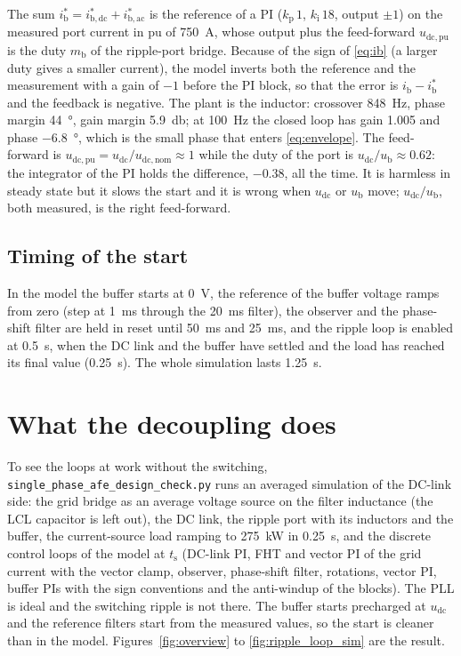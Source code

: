 \documentclass[11pt,a4paper]{scrartcl}
\newcommand{\ped}[1]{_{\mathrm{#1}}}
\newcommand{\code}[1]{\texttt{#1}}
\begin{document}
\begin{onehalfspace}
The sum $i\ped{b}^* = i\ped{b,dc}^* + i\ped{b,ac}^*$ is the reference of a PI ($k\ped{p}\,1$, $k\ped{i}\,18$, output $\pm 1$) on the measured port current in pu of \SI{750}{\ampere}, whose output plus the feed-forward $u\ped{dc,pu}$ is the duty $m\ped{b}$ of the ripple-port bridge. Because of the sign of \eqref{eq:ib} (a larger duty gives a smaller current), the model inverts both the reference and the measurement with a gain of $-1$ before the PI block, so that the error is $i\ped{b} - i\ped{b}^*$ and the feedback is negative. The plant is the inductor: crossover \SI{848}{\hertz}, phase margin \SI{44}{\degree}, gain margin \SI{5.9}{\decibel}; at \SI{100}{\hertz} the closed loop has gain 1.005 and phase \SI{-6.8}{\degree}, which is the small phase that enters \eqref{eq:envelope}. The feed-forward is $u\ped{dc,pu} = u\ped{dc}/u\ped{dc,nom} \approx 1$ while the duty of the port is $u\ped{dc}/u\ped{b} \approx 0.62$: the integrator of the PI holds the difference, $-0.38$, all the time. It is harmless in steady state but it slows the start and it is wrong when $u\ped{dc}$ or $u\ped{b}$ move; $u\ped{dc}/u\ped{b}$, both measured, is the right feed-forward.

\subsection{Timing of the start}

In the model the buffer starts at \SI{0}{\volt}, the reference of the buffer voltage ramps from zero (step at \SI{1}{\milli\second} through the \SI{20}{\milli\second} filter), the observer and the phase-shift filter are held in reset until \SI{50}{\milli\second} and \SI{25}{\milli\second}, and the ripple loop is enabled at \SI{0.5}{\second}, when the DC link and the buffer have settled and the load has reached its final value (\SI{0.25}{\second}). The whole simulation lasts \SI{1.25}{\second}.

\section{What the decoupling does}
\label{sec:results}

To see the loops at work without the switching, \code{single\_phase\_afe\_design\_check.py} runs an averaged simulation of the DC-link side: the grid bridge as an average voltage source on the filter inductance (the LCL capacitor is left out), the DC link, the ripple port with its inductors and the buffer, the current-source load ramping to \SI{275}{\kilo\watt} in \SI{0.25}{\second}, and the discrete control loops of the model at $t\ped{s}$ (DC-link PI, FHT and vector PI of the grid current with the vector clamp, observer, phase-shift filter, rotations, vector PI, buffer PIs with the sign conventions and the anti-windup of the blocks). The PLL is ideal and the switching ripple is not there. The buffer starts precharged at $u\ped{dc}$ and the reference filters start from the measured values, so the start is cleaner than in the model. Figures~\ref{fig:overview} to \ref{fig:ripple_loop_sim} are the result.


\end{onehalfspace}
\end{document}
